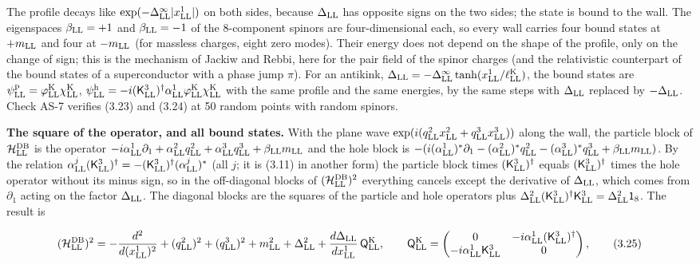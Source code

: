 \documentclass[
  10pt,
]{article}
\begin{document}
The profile decays like
\(\exp(-\Delta^\infty_{\rm LL}\lvert x^1_{\rm LL}\rvert)\) on both
sides, because \(\Delta_{\rm LL}\) has opposite signs on the two sides;
the state is bound to the wall. The eigenspaces \(\beta_{\rm LL}=+1\)
and \(\beta_{\rm LL}=-1\) of the 8-component spinors are
four-dimensional each, so every wall carries four bound states at
\(+m_{\rm LL}\) and four at \(-m_{\rm LL}\) (for massless charges, eight
zero modes). Their energy does not depend on the shape of the profile,
only on the change of sign; this is the mechanism of Jackiw and Rebbi,
here for the pair field of the spinor charges (and the relativistic
counterpart of the bound states of a superconductor with a phase jump
\(\pi\)). For an antikink,
\(\Delta_{\rm LL}=-\Delta^\infty_{\rm LL}\tanh(x^1_{\rm LL}/\ell^{\rm K}_{\rm LL})\),
the bound states are
\(\psi^{\rm p}_{\rm LL}=\varphi^{\rm K}_{\rm LL}\chi^{\rm K}_{\rm LL}\),
\(\psi^{\rm h}_{\rm LL}=-i(\mathsf K^3_{\rm LL})^\dagger\alpha^1_{\rm LL}\varphi^{\rm K}_{\rm LL}\chi^{\rm K}_{\rm LL}\)
with the same profile and the same energies, by the same steps with
\(\Delta_{\rm LL}\) replaced by \(-\Delta_{\rm LL}\). Check AS-7
verifies (3.23) and (3.24) at 50 random points with random spinors.

\textbf{The square of the operator, and all bound states.} With the
plane wave
\(\exp(i(q^2_{\rm LL}x^2_{\rm LL}+q^3_{\rm LL}x^3_{\rm LL}))\) along the
wall, the particle block of \(\mathcal H^{\rm DB}_{\rm LL}\) is the
operator
\(-i\alpha^1_{\rm LL}\partial_1+\alpha^2_{\rm LL}q^2_{\rm LL}+\alpha^3_{\rm LL}q^3_{\rm LL}+\beta_{\rm LL}m_{\rm LL}\)
and the hole block is
\(-(i(\alpha^1_{\rm LL})^*\partial_1-(\alpha^2_{\rm LL})^*q^2_{\rm LL}-(\alpha^3_{\rm LL})^*q^3_{\rm LL}+\beta_{\rm LL}m_{\rm LL})\).
By the relation
\(\alpha^j_{\rm LL}(\mathsf K^3_{\rm LL})^\dagger=-(\mathsf K^3_{\rm LL})^\dagger(\alpha^j_{\rm LL})^*\)
(all \(j\); it is (3.11) in another form) the particle block times
\((\mathsf K^3_{\rm LL})^\dagger\) equals
\((\mathsf K^3_{\rm LL})^\dagger\) times the hole operator without its
minus sign, so in the off-diagonal blocks of
\((\mathcal H^{\rm DB}_{\rm LL})^2\) everything cancels except the
derivative of \(\Delta_{\rm LL}\), which comes from \(\partial_1\)
acting on the factor \(\Delta_{\rm LL}\). The diagonal blocks are the
squares of the particle and hole operators plus
\(\Delta_{\rm LL}^2(\mathsf K^3_{\rm LL})^\dagger\mathsf K^3_{\rm LL}=\Delta_{\rm LL}^2\mathsf 1_8\).
The result is

\[(\mathcal H^{\rm DB}_{\rm LL})^2=-\frac{d^2}{d(x^1_{\rm LL})^2}+(q^2_{\rm LL})^2+(q^3_{\rm LL})^2+m_{\rm LL}^2+\Delta_{\rm LL}^2+\frac{d\Delta_{\rm LL}}{dx^1_{\rm LL}}\,\mathsf Q^{\rm K}_{\rm LL},\qquad\mathsf Q^{\rm K}_{\rm LL}=\begin{pmatrix}0&-i\alpha^1_{\rm LL}(\mathsf K^3_{\rm LL})^\dagger\\-i\alpha^1_{\rm LL}\mathsf K^3_{\rm LL}&0\end{pmatrix},\tag{3.25}\]
\end{document}
